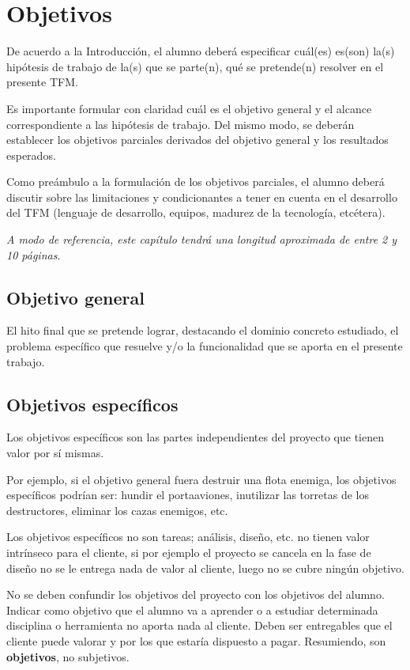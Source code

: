 \chapter{Objetivos}
\label{chap:objetivos}

\noindent
De acuerdo a la Introducción, el alumno deberá especificar cuál(es) es(son)
la(s) hipótesis de trabajo de la(s) que se parte(n), qué se pretende(n) resolver
en el presente TFM.

Es importante formular con claridad cuál es el objetivo general y el alcance
correspondiente a las hipótesis de trabajo. Del mismo modo, se deberán
establecer los objetivos parciales derivados del objetivo general y los
resultados esperados.

Como preámbulo a la formulación de los objetivos parciales, el alumno deberá
discutir sobre las limitaciones y condicionantes a tener en cuenta en el
desarrollo del TFM (lenguaje de desarrollo, equipos, madurez de la tecnología,
etcétera).

\emph{A modo de referencia, este capítulo tendrá una longitud aproximada de
  entre 2 y 10 páginas}.

\section{Objetivo general}

El hito final que se pretende lograr, destacando el dominio concreto estudiado,
el problema específico que resuelve y/o la funcionalidad que se aporta en el
presente trabajo.


\section{Objetivos específicos}

Los objetivos específicos son las partes independientes del proyecto que tienen
valor por sí mismas.

Por ejemplo, si el objetivo general fuera destruir una flota enemiga, los
objetivos específicos podrían ser: hundir el portaaviones, inutilizar las
torretas de los destructores, eliminar los cazas enemigos, etc.

Los objetivos específicos no son tareas; análisis, diseño, etc. no tienen valor
intrínseco para el cliente, si por ejemplo el proyecto se cancela en la fase de
diseño no se le entrega nada de valor al cliente, luego no se cubre ningún
objetivo.

No se deben confundir los objetivos del proyecto con los objetivos del
alumno. Indicar como objetivo que el alumno va a aprender o a estudiar
determinada disciplina o herramienta no aporta nada al cliente. Deben ser
entregables que el cliente puede valorar y por los que estaría dispuesto
a pagar. Resumiendo, son \textbf{objetivos}, no subjetivos.

